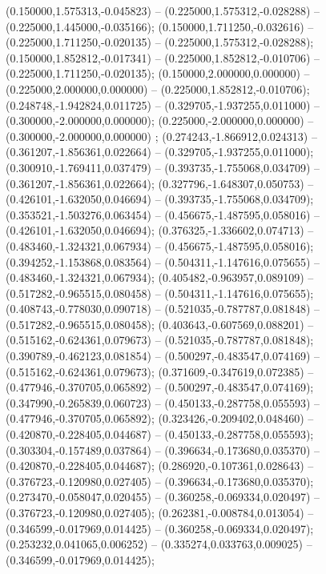  (0.150000,1.575313,-0.045823) -- (0.225000,1.575312,-0.028288) -- (0.225000,1.445000,-0.035166);
 (0.150000,1.711250,-0.032616) -- (0.225000,1.711250,-0.020135) -- (0.225000,1.575312,-0.028288);
 (0.150000,1.852812,-0.017341) -- (0.225000,1.852812,-0.010706) -- (0.225000,1.711250,-0.020135);
 (0.150000,2.000000,0.000000) -- (0.225000,2.000000,0.000000) -- (0.225000,1.852812,-0.010706);
 (0.248748,-1.942824,0.011725) -- (0.329705,-1.937255,0.011000) -- (0.300000,-2.000000,0.000000);
 (0.225000,-2.000000,0.000000) -- (0.300000,-2.000000,0.000000) ;
 (0.274243,-1.866912,0.024313) -- (0.361207,-1.856361,0.022664) -- (0.329705,-1.937255,0.011000);
 (0.300910,-1.769411,0.037479) -- (0.393735,-1.755068,0.034709) -- (0.361207,-1.856361,0.022664);
 (0.327796,-1.648307,0.050753) -- (0.426101,-1.632050,0.046694) -- (0.393735,-1.755068,0.034709);
 (0.353521,-1.503276,0.063454) -- (0.456675,-1.487595,0.058016) -- (0.426101,-1.632050,0.046694);
 (0.376325,-1.336602,0.074713) -- (0.483460,-1.324321,0.067934) -- (0.456675,-1.487595,0.058016);
 (0.394252,-1.153868,0.083564) -- (0.504311,-1.147616,0.075655) -- (0.483460,-1.324321,0.067934);
 (0.405482,-0.963957,0.089109) -- (0.517282,-0.965515,0.080458) -- (0.504311,-1.147616,0.075655);
 (0.408743,-0.778030,0.090718) -- (0.521035,-0.787787,0.081848) -- (0.517282,-0.965515,0.080458);
 (0.403643,-0.607569,0.088201) -- (0.515162,-0.624361,0.079673) -- (0.521035,-0.787787,0.081848);
 (0.390789,-0.462123,0.081854) -- (0.500297,-0.483547,0.074169) -- (0.515162,-0.624361,0.079673);
 (0.371609,-0.347619,0.072385) -- (0.477946,-0.370705,0.065892) -- (0.500297,-0.483547,0.074169);
 (0.347990,-0.265839,0.060723) -- (0.450133,-0.287758,0.055593) -- (0.477946,-0.370705,0.065892);
 (0.323426,-0.209402,0.048460) -- (0.420870,-0.228405,0.044687) -- (0.450133,-0.287758,0.055593);
 (0.303304,-0.157489,0.037864) -- (0.396634,-0.173680,0.035370) -- (0.420870,-0.228405,0.044687);
 (0.286920,-0.107361,0.028643) -- (0.376723,-0.120980,0.027405) -- (0.396634,-0.173680,0.035370);
 (0.273470,-0.058047,0.020455) -- (0.360258,-0.069334,0.020497) -- (0.376723,-0.120980,0.027405);
 (0.262381,-0.008784,0.013054) -- (0.346599,-0.017969,0.014425) -- (0.360258,-0.069334,0.020497);
 (0.253232,0.041065,0.006252) -- (0.335274,0.033763,0.009025) -- (0.346599,-0.017969,0.014425);
